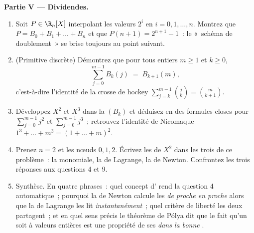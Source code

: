\begin{problem}
\medskip
\noindent\textbf{Partie V --- Dividendes.}
\begin{enumerate}[resume]
  \item Soit $P \in \R_n[X]$ interpolant les valeurs $2^i$ en $i =
        0, 1, \dots, n$. Montrez que $P = B_0 + B_1 + \dots + B_n$
        et que $P(n + 1) = 2^{n+1} - 1$~: le «~schéma de
        doublement~» se brise toujours au point suivant.
  \item (Primitive discrète) Démontrez que pour tous entiers $m
        \geq 1$ et $k \geq 0$,
        \[
        \sum_{j=0}^{m-1} B_k(j) \;=\; B_{k+1}(m),
        \]
        c'est-à-dire l'identité de la crosse de hockey $\sum_{j=k}^{m-1}
        \binom{j}{k} = \binom{m}{k+1}$.
  \item Développez $X^2$ et $X^3$ dans la  $(B_k)$ et déduisez-en
        des formules closes pour $\sum_{j=0}^{m-1} j^2$ et
        $\sum_{j=0}^{m-1} j^3$~; retrouvez l'identité de Nicomaque
        $1^3 + \dots + m^3 = (1 + \dots + m)^2$.
  \item Prenez $n = 2$ et les nœuds $0, 1, 2$. Écrivez les
         de $X^2$ dans les trois  de ce problème~: la
         monomiale, la  de Lagrange, la  de Newton.
        Confrontez les trois réponses aux questions 4 et 9.
  \item Synthèse. En quatre phrases~: quel concept d'
        rend la question 4 automatique~; pourquoi la  de Newton
        calcule les  \emph{de proche en proche} alors que
        la  de Lagrange les lit \emph{instantanément}~; quel
        critère de liberté les deux  partagent~; et en quel sens
        précis le théorème de Pólya dit que le fait qu'un 
        soit à valeurs entières est une propriété de ses 
        \emph{dans la bonne }.
\end{enumerate}
\end{problem}
